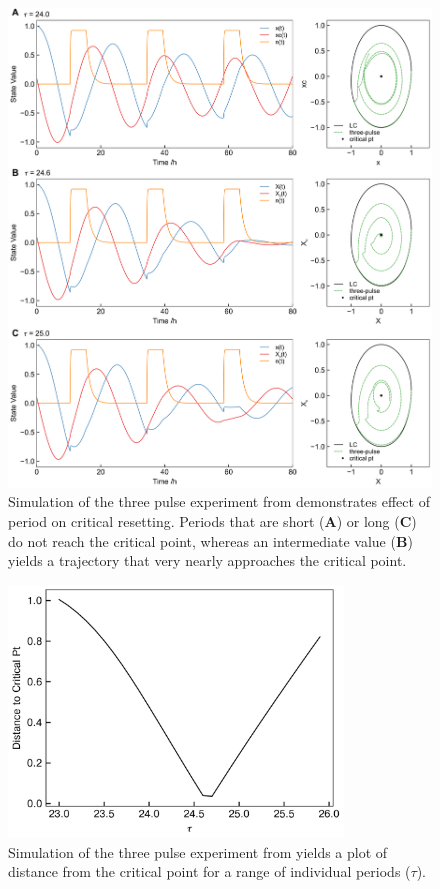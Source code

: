 \begin{figure}[p]
    \begin{center}
        \includegraphics[width=6.5in]{chap10/figures/blind.png}
    \end{center}
        \caption{\label{fig:blind} Simulation of the three pulse experiment from \cite{Kronauer1999} demonstrates effect of period on critical resetting.
    Periods that are short (\textbf{A}) or long (\textbf{C}) do not reach the critical point, whereas an intermediate value (\textbf{B}) yields a trajectory that very nearly approaches the critical point.}
\end{figure}

\begin{figure}[p]
    \begin{center}
        \includegraphics[width=3.5in]{chap10/figures/threepulse_sensitivity.png}
    \end{center}
        \caption{\label{fig:blind2} Simulation of the three pulse experiment from \cite{Kronauer1999} yields a plot of distance from the critical point for a range of individual periods ($\tau$).}
\end{figure}

